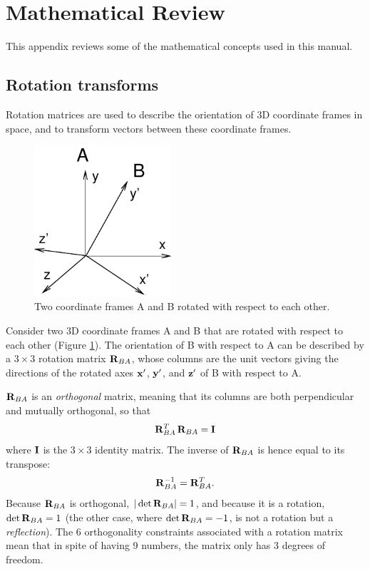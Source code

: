 \appendix

\section{Mathematical Review}
\label{MathematicalReview:sec}

This appendix reviews some of the mathematical concepts used in this
manual.

\subsection{Rotation transforms}
\label{Rotations:sec}

Rotation matrices are used to describe the orientation of 3D
coordinate frames in space, and to transform vectors between these
coordinate frames.

\begin{figure}[t]
\begin{center}
\includegraphics[width=2in]{images/rotationAB}
\end{center}
\caption{Two coordinate frames A and B rotated with respect
to each other.}
\label{rotationAB:fig}
\end{figure}

Consider two 3D coordinate frames A and B that are rotated with
respect to each other (Figure \ref{rotationAB:fig}).  The orientation
of B with respect to A can be described by a $3 \times 3$ rotation
matrix ${\bf R}_{BA}$, whose columns are the unit vectors giving the
directions of the rotated axes ${\bf x}'$, ${\bf y}'$, and ${\bf z}'$ of B with
respect to A.

${\bf R}_{BA}$ is an {\it orthogonal} matrix, meaning that
its columns are both perpendicular and mutually
orthogonal, so that
%
\begin{equation}
{\bf R}_{BA}^T \, {\bf R}_{BA} = {\bf I}
\end{equation}
%
where ${\bf I}$ is the $3 \times 3$ identity matrix. The inverse
of ${\bf R}_{BA}$ is hence equal to its transpose:
%
\begin{equation}
{\bf R}_{BA}^{-1} = {\bf R}_{BA}^T.
\label{RABinv:eqn}
\end{equation}
%
Because ${\bf R}_{BA}$ is orthogonal, $|\det {\bf R}_{BA}| = 1$, and because it
is a rotation, $\det {\bf R}_{BA} = 1$ (the other case, where $\det {\bf R}_{BA}
= -1$, is not a rotation but a {\it reflection}).  The 6 orthogonality
constraints associated with a rotation matrix mean that in spite of
having 9 numbers, the matrix only has 3 degrees of freedom.

